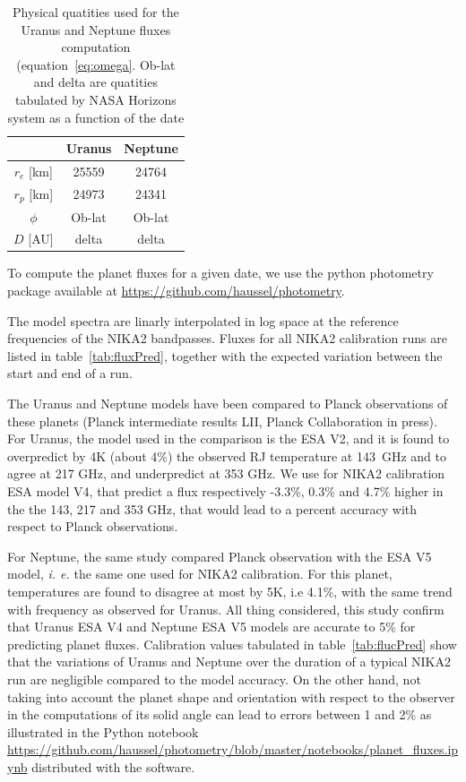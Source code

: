 \begin{table}
\begin{center}
\begin{tabular}{|c|c|c|}
\hline
     & Uranus & Neptune \\
\hline
$r_{e}$ [km]  & 25559 & 24764 \\ 
\hline
$r_{p}$ [km]  & 24973 & 24341  \\
\hline
$\phi$         & Ob-lat & Ob-lat \\
\hline
$D$   [AU]    & delta   & delta \\
\hline
\end{tabular}
\end{center}
\caption{Physical quatities used for the Uranus and Neptune fluxes
  computation (equation~\ref{eq:omega}. Ob-lat and delta are quatities tabulated by NASA
  Horizons system as a function of the date}
\label{tab:planetphysparam}
\end{table}

To compute the planet fluxes for a given date, we use the python
photometry package available at
\url{https://github.com/haussel/photometry}.
 
The model spectra are linarly interpolated in log space at the
reference frequencies of the NIKA2 bandpasses. Fluxes for all NIKA2
calibration runs are listed in table~\ref{tab:fluxPred}, together with
the expected variation between the start and end of a run. 

The Uranus and Neptune models have been compared to Planck
observations of these planets (Planck intermediate results LII, Planck
Collaboration in press). For Uranus, the model used in the comparison
is the ESA V2, and it is found to overpredict by 4K (about 4\%) the
observed RJ temperature at 143~GHz and to agree at 217 GHz, and
underpredict at 353 GHz. We use for NIKA2 calibration ESA model V4,
that predict a flux respectively -3.3\%, 0.3\% and 4.7\% higher in the
the 143, 217 and 353 GHz, that would lead to a percent
accuracy with respect to Planck observations. 

For Neptune, the same study compared Planck observation with the ESA V5
model, {\it i. e.} the same one used for NIKA2 calibration. For this
planet, temperatures are found to disagree at most by 5K, i.e 4.1\%,
with the same trend with frequency as observed for Uranus. All thing
considered, this study confirm that Uranus ESA V4 and Neptune ESA V5
models are accurate to 5\% for predicting planet fluxes. Calibration
values tabulated in table~\ref{tab:flucPred} show that the variations
of Uranus and Neptune over the duration of a typical NIKA2 run are
negligible compared to the model accuracy. On the other hand, not
taking into account the planet shape and orientation with respect to
the observer in the computations of its solid angle can lead to errors
between 1 and 2\% as illustrated in the Python notebook
\url{https://github.com/haussel/photometry/blob/master/notebooks/planet_fluxes.ipynb}
distributed with the software. 



